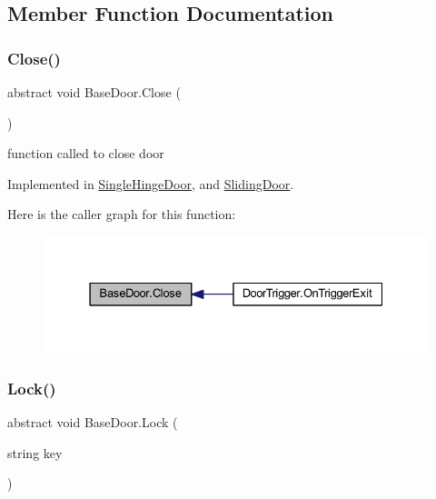 \subsection{Member Function Documentation}
\mbox{\label{class_base_door_a94151e5cbf90bd3d2b55f339b87916c7}} 
\subsubsection{\texorpdfstring{Close()}{Close()}}
{\footnotesize\ttfamily abstract void Base\+Door.\+Close (\begin{DoxyParamCaption}{ }\end{DoxyParamCaption})\hspace{0.3cm}{\ttfamily [pure virtual]}}



function called to close door 



Implemented in \mbox{\hyperlink{class_single_hinge_door_a19848e36fb259f92594916d1af76d3b4}{Single\+Hinge\+Door}}, and \mbox{\hyperlink{class_sliding_door_a22d2e8580503b045da48510214599746}{Sliding\+Door}}.

Here is the caller graph for this function\+:
\nopagebreak
\begin{figure}[H]
\begin{center}
\leavevmode
\includegraphics[width=331pt]{class_base_door_a94151e5cbf90bd3d2b55f339b87916c7_icgraph}
\end{center}
\end{figure}
\mbox{\label{class_base_door_a2b616c52626299f25ac25f7deab44dc4}} 
\subsubsection{\texorpdfstring{Lock()}{Lock()}}
{\footnotesize\ttfamily abstract void Base\+Door.\+Lock (\begin{DoxyParamCaption}\item[{string}]{key }\end{DoxyParamCaption})\hspace{0.3cm}{\ttfamily [pure virtual]}}



